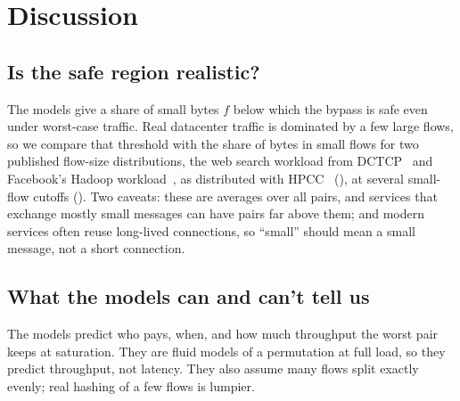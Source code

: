 \section{Discussion}
\label{sec:discussion}

\subsection{Is the safe region realistic?}

The models give a share of small bytes $f$ below which the bypass is safe even under worst-case traffic. Real datacenter traffic is dominated by a few large flows, so we compare that threshold with the share of bytes in small flows for two published flow-size distributions, the web search workload from DCTCP~\cite{dctcp} and Facebook's Hadoop workload~\cite{fbdc}, as distributed with HPCC~\cite{hpcc} (), at several small-flow cutoffs (). Two caveats: these are averages over all pairs, and services that exchange mostly small messages can have pairs far above them; and modern services often reuse long-lived connections, so ``small'' should mean a small message, not a short connection.

\subsection{What the models can and can't tell us}

The models predict who pays, when, and how much throughput the worst pair keeps at saturation. They are fluid models of a permutation at full load, so they predict throughput, not latency. They also assume many flows split exactly evenly; real hashing of a few flows is lumpier.
